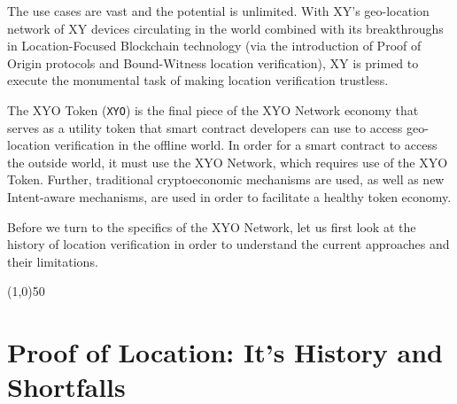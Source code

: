 \documentclass{article}
\begin{document}
The use cases are vast and the potential is unlimited. With XY's geo-location network of XY devices circulating in the world combined with its breakthroughs in Location-Focused Blockchain technology (via the introduction of Proof of Origin protocols and Bound-Witness location verification), XY is primed to execute the monumental task of making location verification trustless. 

The XYO Token (\texttt{XYO}) is the final piece of the XYO Network economy that serves as  a utility token that smart contract developers can use to access geo-location verification in the offline world. In order for a smart contract to access the outside world, it must use the XYO Network, which requires use of the XYO Token. Further, traditional cryptoeconomic mechanisms are used, as well as new Intent-aware mechanisms, are used in order to facilitate a healthy token economy.

Before we turn to the specifics of the XYO Network, let us first look at the history of location verification in order to understand the current approaches and their limitations. 

\begin{center}
\line(1,0){50}
\end{center}


\section{Proof of Location: It's History and Shortfalls}
\end{document}
